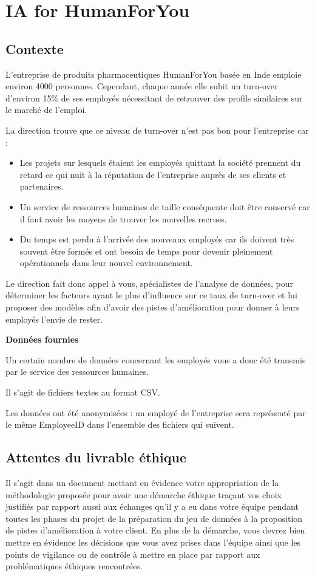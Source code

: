 \section{IA for HumanForYou}
\subsection{Contexte}
L'entreprise de produits pharmaceutiques HumanForYou basée en Inde emploie environ 4000 personnes. Cependant, chaque année elle subit un turn-over d'environ 15\% de ses employés nécessitant de retrouver des profils similaires sur le marché de l'emploi.

La direction trouve que ce niveau de turn-over n'est pas bon pour l'entreprise car :

\begin{itemize}
    \item Les projets sur lesquels étaient les employés quittant la société prennent du retard ce qui nuit à la réputation de l'entreprise auprès de ses clients et partenaires.
    \item Un service de ressources humaines de taille conséquente doit être conservé car il faut avoir les moyens de trouver les nouvelles recrues.
    \item Du temps est perdu à l'arrivée des nouveaux employés car ils doivent très souvent être formés et ont besoin de temps pour devenir pleinement opérationnels dans leur nouvel environnement.
\end{itemize}

Le direction fait donc appel à vous, spécialistes de l'analyse de données, pour déterminer les facteurs ayant le plus d'influence sur ce taux de turn-over et lui proposer des modèles afin d'avoir des pistes d'amélioration pour donner à leurs employés l'envie de rester.

\textbf{Données fournies}

Un certain nombre de données concernant les employés vous a donc été transmis par le service des ressources humaines.

Il s'agit de fichiers textes au format CSV.

Les données ont été anonymisées : un employé de l'entreprise sera représenté par le même EmployeeID dans l'ensemble des fichiers qui suivent.
\subsection{Attentes du livrable éthique}
Il s'agit dans un document mettant en évidence votre appropriation de la méthodologie proposée pour avoir une démarche éthique traçant vos choix justifiés par rapport aussi aux échanges qu'il y a eu dans votre équipe pendant toutes les phases du projet de la préparation du jeu de données à la proposition de pistes d'amélioration à votre client. En plus de la démarche, vous devrez bien mettre en évidence les décisions que vous avez prises dans l'équipe ainsi que les points de vigilance ou de contrôle à mettre en place par rapport aux problématiques éthiques rencontrées.

